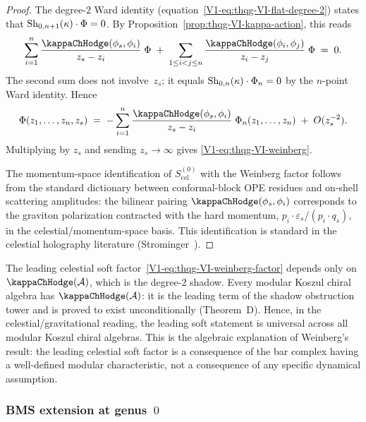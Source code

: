 \begin{proof}
The degree-$2$ Ward identity
(equation~\eqref{V1-eq:thqg-VI-flat-degree-2}) states that
$\operatorname{Sh}_{0,n+1}(\kappa) \cdot \Phi = 0$.
By Proposition~\ref{prop:thqg-VI-kappa-action}, this reads
\[
\sum_{i=1}^{n}
\frac{\kappaChHodge(\phi_s, \phi_i)}{z_s - z_i}\;\Phi
\;+\;
\sum_{1 \leq i < j \leq n}
\frac{\kappaChHodge(\phi_i, \phi_j)}{z_i - z_j}\;\Phi
\;=\; 0.
\]
The second sum does not involve~$z_s$; it equals
$\operatorname{Sh}_{0,n}(\kappa) \cdot \Phi_n = 0$ by the $n$-point Ward
identity. Hence
\[
\Phi(z_1, \dotsc, z_n, z_s)
\;=\;
-\sum_{i=1}^{n}
\frac{\kappaChHodge(\phi_s, \phi_i)}{z_s - z_i}\;\Phi_n(z_1, \dotsc, z_n)
\;+\; O(z_s^{-2}).
\]
Multiplying by $z_s$ and sending $z_s \to \infty$ gives
\eqref{V1-eq:thqg-VI-weinberg}.

The momentum-space identification of
$S^{(0)}_{\mathrm{cel}}$ with the Weinberg factor follows from the standard
dictionary between conformal-block OPE residues and on-shell
scattering amplitudes: the bilinear pairing $\kappaChHodge(\phi_s, \phi_i)$
corresponds to the graviton polarization contracted with the hard
momentum, $p_i \cdot \varepsilon_s / (p_i \cdot q_s)$, in the
celestial/momentum-space basis. This identification is standard
in the celestial holography literature
(Strominger~\cite{Strominger18}).
\end{proof}

\begin{remark}
The leading celestial soft factor~\eqref{V1-eq:thqg-VI-weinberg-factor} depends
only on $\kappaChHodge(\cA)$, which is the degree-$2$ shadow. Every
modular Koszul chiral algebra has $\kappaChHodge(\cA)$: it is the
leading term of the shadow obstruction tower and is proved to exist
unconditionally (Theorem~D). Hence, in the celestial/gravitational
reading, the leading soft statement is universal across all
modular Koszul chiral algebras. This is the algebraic explanation of Weinberg's
result: the leading celestial soft factor is a consequence of the bar complex
having a well-defined modular characteristic, not a consequence of
any specific dynamical assumption.
\end{remark}

\subsubsection{BMS extension at genus~$0$}

